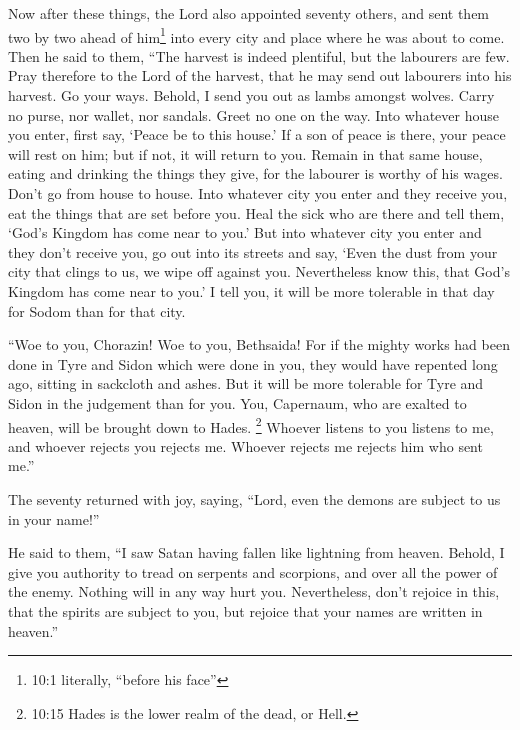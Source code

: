  Now after these things, the Lord also appointed seventy
others, and sent them two by two ahead of him\footnote{10:1 literally,
  ``before his face''} into every city and place where he was about to
come.  Then he said to them, ``The harvest is indeed
plentiful, but the labourers are few. Pray therefore to the Lord of the
harvest, that he may send out labourers into his harvest. 
Go your ways. Behold, I send you out as lambs amongst wolves.
 Carry no purse, nor wallet, nor sandals. Greet no one on
the way.  Into whatever house you enter, first say, `Peace
be to this house.'  If a son of peace is there, your peace
will rest on him; but if not, it will return to you.  Remain
in that same house, eating and drinking the things they give, for the
labourer is worthy of his wages. Don't go from house to house.
 Into whatever city you enter and they receive you, eat the
things that are set before you.  Heal the sick who are there
and tell them, `God's Kingdom has come near to you.'  But
into whatever city you enter and they don't receive you, go out into its
streets and say,  `Even the dust from your city that clings
to us, we wipe off against you. Nevertheless know this, that God's
Kingdom has come near to you.'  I tell you, it will be more
tolerable in that day for Sodom than for that city.

 ``Woe to you, Chorazin! Woe to you, Bethsaida! For if the
mighty works had been done in Tyre and Sidon which were done in you,
they would have repented long ago, sitting in sackcloth and ashes.
 But it will be more tolerable for Tyre and Sidon in the
judgement than for you.  You, Capernaum, who are exalted to
heaven, will be brought down to Hades. \footnote{10:15 Hades is the
  lower realm of the dead, or Hell.}  Whoever listens to
you listens to me, and whoever rejects you rejects me. Whoever rejects
me rejects him who sent me.''

 The seventy returned with joy, saying, ``Lord, even the
demons are subject to us in your name!''

 He said to them, ``I saw Satan having fallen like
lightning from heaven.  Behold, I give you authority to
tread on serpents and scorpions, and over all the power of the enemy.
Nothing will in any way hurt you.  Nevertheless, don't
rejoice in this, that the spirits are subject to you, but rejoice that
your names are written in heaven.''

